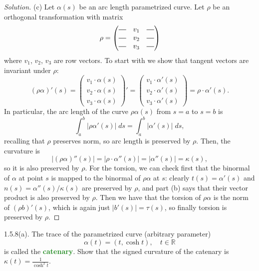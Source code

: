 \documentclass[11pt]{scrartcl}
\providecommand{\RR}{\mathbb R}
\providecommand{\dif}{\;d}
\newcommand*{\horzbar}{\rule[.5ex]{2.5ex}{0.5pt}}
\newenvironment{soln}{\begin{proof}[Solution]}{\end{proof}}
\providecommand{\vocab}[1]{{\textbf{\textcolor{ForestGreen}{#1}}}}
\begin{document}
\begin{soln}
	(c) Let $\alpha(s)$ be an arc length parametrized curve.
	Let $\rho$ be an orthogonal transformation with matrix
	\[\rho = \begin{pmatrix}
		\horzbar&v_1&\horzbar\\
		\horzbar&v_2&\horzbar\\
		\horzbar&v_3&\horzbar
	\end{pmatrix}\]
	where $v_1$, $v_2$, $v_3$ are row vectors.
	To start with we show that tangent vectors are invariant under $\rho$:
	\[(\rho\alpha)'(s) = \begin{pmatrix}
		v_1\cdot\alpha(s)\\v_2\cdot\alpha(s)\\v_3\cdot\alpha(s)
	\end{pmatrix}' =\begin{pmatrix}
		v_1\cdot\alpha'(s)\\v_2\cdot\alpha'(s)\\v_3\cdot\alpha'(s)
	\end{pmatrix} = \rho\cdot\alpha'(s).\]
	In particular, the arc length of the curve $\rho\alpha(s)$
	from $s=a$ to $s=b$ is
	\[\int_a^b |\rho\alpha'(s)|\dif s = \int_a^b |\alpha'(s)|\dif s,\]
	recalling that $\rho$ preserves norm, so arc length is preserved by $\rho$.
	Then, the curvature is
	\[|(\rho\alpha)''(s)| = |\rho\cdot\alpha''(s)| =
	|\alpha''(s)| = \kappa(s),\]
	so it is also preserved by $\rho$. For the torsion, we can check first that
	the binormal of $\alpha$ at point $s$ is mapped to the binormal
	of $\rho\alpha$ at $s$: clearly $t(s) = \alpha'(s)$
	and $n(s) = \alpha''(s)/\kappa(s)$ are preserved by $\rho$,
	and part (b) says that their vector product is also preserved by $\rho$.
	Then we have that the torsion of $\rho\alpha$ is the norm of
	$(\rho b)'(s)$, which is again just $|b'(s)| = \tau(s)$,
	so finally torsion is preserved by $\rho$.
\end{soln}

\begin{problem*}1.5.8(a).
	The trace of the parametrized curve (arbitrary parameter)
	\[\alpha(t) = (t, \cosh t),\quad t\in\RR\]
	is called the \vocab{catenary}. Show that the signed curvature
	of the catenary is $\kappa(t) = \frac{1}{\cosh^2t}$.
\end{problem*}
\end{document}
